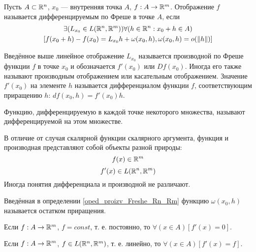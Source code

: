 \begin{opr}\label{oped_proizv_Freshe_Rn_Rm}
Пусть $A\subset\mathbb{R}^n$, $x_0$ --- внутренняя точка $A$, $f:A\to\mathbb{R}^m$.
Отображение $f$ называется дифференцируемым по Фреше в точке $A$, если
\begin{multline}
\exists(L_{x_0}\in L(\mathbb{R}^n,\mathbb{R}^m))\forall(h\in \mathbb{R}^n: x_0+h\in A)
\\
[f(x_0+h)-f(x_0)=L_{x_0}h+\omega(x_0,h), \omega(x_0,h)=o(\|h\|)]
\end{multline}
\end{opr}

\begin{opr}
Введённое выше линейное отображение $L_{x_0}$ называется производной по Фреше функции $f$ в точке $x_0$ и обозначается $f'(x_0)$ или $Df(x_0)$. Иногда его также называют производным отображением или касательным отображением.
Значение $f'(x_0)$ на элементе $h$ называется дифференциалом функции $f$, соответствующим приращению $h$: $df(x_0,h)=f'(x_0)h$.
\end{opr}

\begin{opr}
Функцию, дифференцируемую в каждой точке некоторого множества, называют дифференцируемой на этом множестве.
\end{opr}

\begin{zamech}
В отличие от случая скалярной функции скалярного аргумента, функция и производная представляют собой объекты разной природы:
$$
f(x)\in\mathbb{R}^m
$$
$$
f'(x)\in L(\mathbb{R}^n,\mathbb{R}^m)
$$
Иногда понятия дифференциала и производной не различают.
\end{zamech}

\begin{opr}
Введённая в определении \ref{oped_proizv_Freshe_Rn_Rm} функцию $\omega(x_0,h)$ называется остатком приращения.
\end{opr}

\begin{primer}
Если $f:A\to\mathbb{R}^m$, $f=const$, т. е. постоянно, то $\forall(x\in A)[f'(x)=0]$.
\end{primer}

\begin{primer}
Если $f:A\to\mathbb{R}^m$, $f\in L(\mathbb{R}^n,\mathbb{R}^m)$, т. е. линейно, то $\forall(x\in A)[f'(x)=f]$.
\end{primer}

